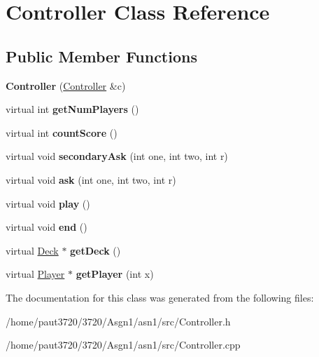 \hypertarget{class_controller}{\section{Controller Class Reference}
\label{class_controller}
}
\subsection*{Public Member Functions}
\begin{DoxyCompactItemize}
\item 
\hypertarget{class_controller_a83fcc0cd75241919b97ccd5b8979abea}{{\bfseries Controller} (\hyperlink{class_controller}{Controller} \&c)}\label{class_controller_a83fcc0cd75241919b97ccd5b8979abea}

\item 
\hypertarget{class_controller_a3f15ce4525d7b549bb97bc8aa28b27df}{virtual int {\bfseries get\-Num\-Players} ()}\label{class_controller_a3f15ce4525d7b549bb97bc8aa28b27df}

\item 
\hypertarget{class_controller_af5adf67e5e0a9687dffd5849ac55286a}{virtual int {\bfseries count\-Score} ()}\label{class_controller_af5adf67e5e0a9687dffd5849ac55286a}

\item 
\hypertarget{class_controller_adda40f006be0a2b71ba501faa82c0f7f}{virtual void {\bfseries secondary\-Ask} (int one, int two, int r)}\label{class_controller_adda40f006be0a2b71ba501faa82c0f7f}

\item 
\hypertarget{class_controller_aaf93a21469ace0bcffd330c48ed752b3}{virtual void {\bfseries ask} (int one, int two, int r)}\label{class_controller_aaf93a21469ace0bcffd330c48ed752b3}

\item 
\hypertarget{class_controller_a8eaafa793bc05b538e21594159ae6364}{virtual void {\bfseries play} ()}\label{class_controller_a8eaafa793bc05b538e21594159ae6364}

\item 
\hypertarget{class_controller_aaa374c56ef024a31888ab048baf0219c}{virtual void {\bfseries end} ()}\label{class_controller_aaa374c56ef024a31888ab048baf0219c}

\item 
\hypertarget{class_controller_aa1969f48ec5b093eb4faed2179ae42ff}{virtual \hyperlink{class_deck}{Deck} $\ast$ {\bfseries get\-Deck} ()}\label{class_controller_aa1969f48ec5b093eb4faed2179ae42ff}

\item 
\hypertarget{class_controller_a2de9151b2db8ceb7eca5375bf599dab5}{virtual \hyperlink{class_player}{Player} $\ast$ {\bfseries get\-Player} (int x)}\label{class_controller_a2de9151b2db8ceb7eca5375bf599dab5}

\end{DoxyCompactItemize}


The documentation for this class was generated from the following files\-:\begin{DoxyCompactItemize}
\item 
/home/paut3720/3720/\-Asgn1/asn1/src/Controller.\-h\item 
/home/paut3720/3720/\-Asgn1/asn1/src/Controller.\-cpp\end{DoxyCompactItemize}
